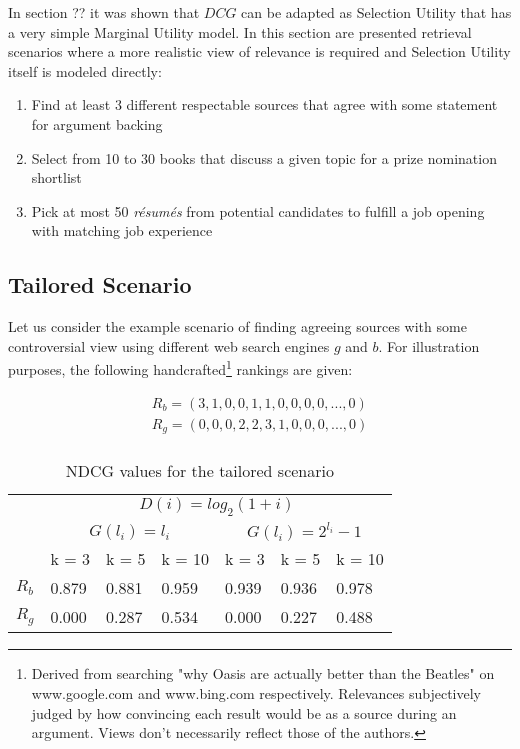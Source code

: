 \documentclass[a4paper, 10pt, conference]{ieeeconf}
\begin{document}
In section ?? it was shown that $DCG$ can be adapted as Selection Utility that
has a very simple Marginal Utility model. In this section are presented
retrieval scenarios where a more realistic view of relevance is required and
Selection Utility itself is modeled directly:

\begin{enumerate}
\item Find at least 3 different respectable sources that agree with some statement for argument backing
\item Select from 10 to 30 books that discuss a given topic for a prize nomination shortlist
\item  Pick at most 50 \textit{résumés} from potential candidates to fulfill a job opening with matching job experience
\end{enumerate}

\subsection{Tailored Scenario}
Let us consider the example scenario of finding agreeing sources with some
controversial view using different web search engines $g$ and $b$. For
illustration purposes, the following handcrafted\footnote{Derived from searching
"why Oasis are actually better than the Beatles" on www.google.com and
www.bing.com respectively. Relevances subjectively judged by how convincing each
result would be as a source during an argument. Views don't necessarily reflect
those of the authors.} rankings are given:

\begin{equation}
\label{eq:tailored}
\begin{aligned}
R_b = (3,1,0,0,1,1,0,0,0,0,...,0) \\
R_g = (0,0,0,2,2,3,1,0,0,0,...,0) \\
\end{aligned}
\end{equation}

\begin{table}
\label{tb:tailored:rankings}
\centering
\caption{NDCG values for the tailored scenario}
\begin{tabular}{l|l|l|l|l|l|l|}
\cline{2-7}
    & \multicolumn{6}{c|}{$D(i) = log_2(1 + i)$} \\
\cline{2-7}
    & \multicolumn{3}{c|}{$G(l_i) = l_i$} & \multicolumn{3}{c|}{$G(l_i) = 2^{l_i} - 1$}\\
\cline{2-7}
    & k = 3 & k = 5 & k = 10 & k = 3 & k = 5 & k = 10 \\
\hline \multicolumn{1}{|l|}{$R_b$}
    & 0.879 & 0.881 & 0.959 & 0.939 & 0.936 & 0.978 \\
\hline \multicolumn{1}{|l|}{$R_g$}
    & 0.000 & 0.287 & 0.534 & 0.000 & 0.227 & 0.488  \\
\hline
\end{tabular}
\end{table}
\end{document}
